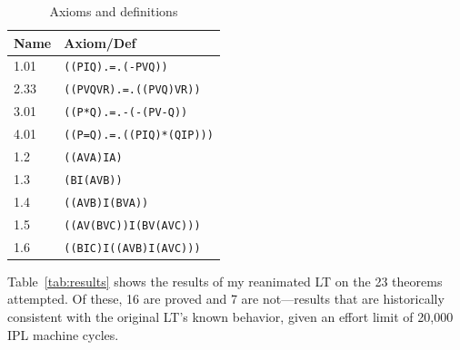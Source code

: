 \documentclass[journal]{IEEEtran}
\begin{document}
\begin{table}[h]
\centering
\caption{Axioms and definitions}
\label{tab:axioms}
\begin{tabular}{ll}
\toprule
\textbf{Name} & \textbf{Axiom/Def}\\
\midrule
1.01  & \texttt{((PIQ).=.(-PVQ))}\\
2.33  & \texttt{((PVQVR).=.((PVQ)VR))}\\
3.01  & \texttt{((P*Q).=.-(-(PV-Q))}\\
4.01  & \texttt{((P=Q).=.((PIQ)*(QIP)))}\\
1.2   & \texttt{((AVA)IA)}\\
1.3   & \texttt{(BI(AVB))}\\
1.4   & \texttt{((AVB)I(BVA))}\\
1.5   & \texttt{((AV(BVC))I(BV(AVC)))}\\
1.6   & \texttt{((BIC)I((AVB)I(AVC)))}\\
\bottomrule
\end{tabular}
\end{table}


Table~\ref{tab:results} shows the results of my reanimated LT on the
23 theorems attempted. Of these, 16 are proved and 7 are not---results
that are historically consistent with the original LT's known
behavior, given an effort limit of 20,000 IPL machine cycles.
\end{document}

